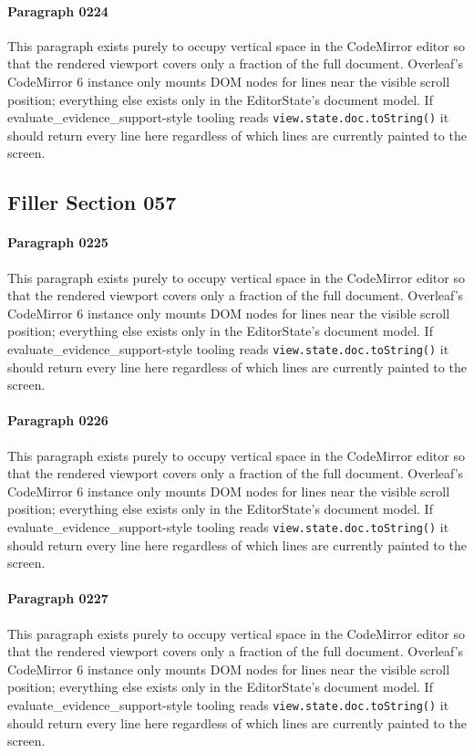 \documentclass{article}
\begin{document}
\paragraph{Paragraph 0224}
This paragraph exists purely to occupy vertical space in the CodeMirror editor so that the rendered viewport covers only a fraction of the full document. Overleaf's CodeMirror 6 instance only mounts DOM nodes for lines near the visible scroll position; everything else exists only in the EditorState's document model. If evaluate\_evidence\_support-style tooling reads \texttt{view.state.doc.toString()} it should return every line here regardless of which lines are currently painted to the screen.

\subsection{Filler Section 057}
\paragraph{Paragraph 0225}
This paragraph exists purely to occupy vertical space in the CodeMirror editor so that the rendered viewport covers only a fraction of the full document. Overleaf's CodeMirror 6 instance only mounts DOM nodes for lines near the visible scroll position; everything else exists only in the EditorState's document model. If evaluate\_evidence\_support-style tooling reads \texttt{view.state.doc.toString()} it should return every line here regardless of which lines are currently painted to the screen.

\paragraph{Paragraph 0226}
This paragraph exists purely to occupy vertical space in the CodeMirror editor so that the rendered viewport covers only a fraction of the full document. Overleaf's CodeMirror 6 instance only mounts DOM nodes for lines near the visible scroll position; everything else exists only in the EditorState's document model. If evaluate\_evidence\_support-style tooling reads \texttt{view.state.doc.toString()} it should return every line here regardless of which lines are currently painted to the screen.

\paragraph{Paragraph 0227}
This paragraph exists purely to occupy vertical space in the CodeMirror editor so that the rendered viewport covers only a fraction of the full document. Overleaf's CodeMirror 6 instance only mounts DOM nodes for lines near the visible scroll position; everything else exists only in the EditorState's document model. If evaluate\_evidence\_support-style tooling reads \texttt{view.state.doc.toString()} it should return every line here regardless of which lines are currently painted to the screen.
\end{document}
